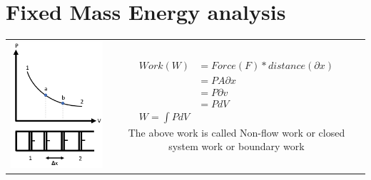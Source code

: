 \documentclass[12pt]{article}
\begin{document}
\section{Fixed Mass Energy analysis}
	\begin{table}[H]
		\centering
		\begin{tabular}{cc}
			\parbox{5cm}{\includegraphics[scale=0.5]{closedsyswork.png}} 
			& \parbox{7cm}{
			\begin{align*}
			Work(W)&= Force(F)*distance(\partial x)\\
			&= PA\partial x\\
			&= P\partial v\\
			&= PdV\\
			\boxed{W = \int PdV}
			\end{align*}
			The above work is called Non-flow work or closed system work or boundary work}
		\end{tabular}
	\end{table}
	
\end{document}
